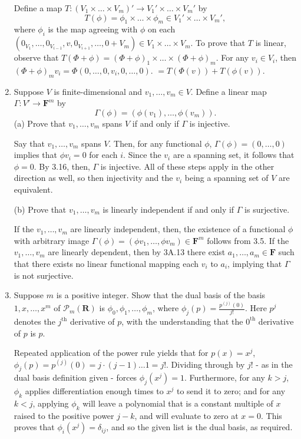 \documentclass{book}
\begin{document}
\begin{enumerate}
Define a map \(T: (V_1 \times \dots \times V_m)' \rightarrow V_1' \times \dots \times V_m'\) by \[T(\phi)=\phi_1 \times \dots \times \phi_m \in V_1' \times \dots \times V_m',\] where \(\phi_i\) is the map agreeing with \(\phi\) on each \((0_{V_1},\dots,0_{V_{i-1}},v,0_{V_{i+1}},\dots,0+{V_m}) \in V_1 \times \dots \times V_m\).  To prove that \(T\) is linear, observe that \(T(\Phi+\phi)=(\Phi+\phi)_1 \times \dots \times (\Phi+\phi)_m\).  For any \(v_i \in V_i\), then \((\Phi+\phi)_mv_i=\Phi(0,\dots,0,v_i,0,\dots,0)\).  \(=T(\Phi(v))+T(\phi(v))\).

\item Suppose \(V\) is finite-dimensional and \(v_1,\dots,v_m \in V\).  Define a linear map \(\Gamma: V' \rightarrow \textbf{F}^m\) by \[\Gamma(\phi)=(\phi(v_1),\dots,\phi(v_m)).\]
(a) Prove that \(v_1,\dots,v_m\) spans \(V\) if and only if \(\Gamma\) is injective.

Say that \(v_1,\dots,v_m\) spans \(V\).  Then, for any functional \(\phi\), \(\Gamma(\phi) = (0,\dots,0)\) implies that \(\phi v_i = 0\) for each \(i\).  Since the \(v_i\) are a spanning set, it follows that \(\phi = 0\).  By 3.16, then, \(\Gamma\) is injective.  All of these steps apply in the other direction as well, so then injectivity and the \(v_i\) being a spanning set of \(V\) are equivalent.

(b) Prove that \(v_1,\dots,v_m\) is linearly independent if and only if \(\Gamma\) is surjective.

If the \(v_1,\dots,v_m\) are linearly independent, then, the existence of a functional \(\phi\) with arbitrary image \(\Gamma(\phi) = (\phi v_1,\dots,\phi v_m) \in \textbf{F}^m\) follows from 3.5.  If the \(v_1,\dots,v_m\) are linearly dependent, then by 3A.13 there exist \(a_1,\dots,a_m \in \textbf{F}\) such that there exists no linear functional mapping each \(v_i\) to \(a_i\), implying that \(\Gamma\) is not surjective.

\item Suppose \(m\) is a positive integer.  Show that the dual basis of the basis \(1,x,\dots,x^m\) of \(\mathcal{P}_m(\textbf{R})\) is \(\phi_0,\phi_1,\dots,\phi_m\), where \(\phi_j(p)=\frac{p^{(j)}(0)}{j!}\).  Here \(p^{j}\) denotes the \(j^{\textrm{th}}\) derivative of \(p\), with the understanding that the \(0^{\textrm{th}}\) derivative of \(p\) is \(p\).

Repeated application of the power rule yields that for \(p(x) = x^j\), \(\phi_j(p) = p^{(j)}(0) = j \cdot (j-1) \dots 1 = j!\).  Dividing through by \(j!\) - as in the dual basis definition given - forces \(\phi_j(x^j) = 1\).  Furthermore, for any \(k>j\), \(\phi_k\) applies differentiation enough times to \(x^j\) to send it to zero; and for any \(k < j\), applying \(\phi_k\) will leave a polynomial that is a constant multiple of \(x\) raised to the positive power \(j-k\), and will evaluate to zero at \(x=0\).  This proves that \(\phi_i(x^j) = \delta_{ij}\), and so the given list is the dual basis, as required.


\end{enumerate}
\end{document}
